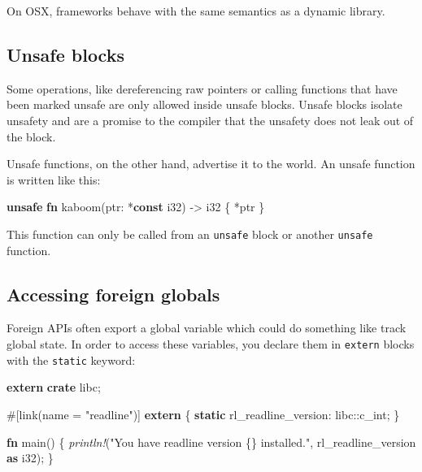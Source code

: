 \documentclass[a4paper,]{book}
\newenvironment{Shaded}{\begin{snugshade}}{\end{snugshade}}
\newcommand{\KeywordTok}[1]{\textcolor[rgb]{0.13,0.29,0.53}{\textbf{{#1}}}}
\newcommand{\DataTypeTok}[1]{\textcolor[rgb]{0.13,0.29,0.53}{{#1}}}
\newcommand{\StringTok}[1]{\textcolor[rgb]{0.31,0.60,0.02}{{#1}}}
\newcommand{\PreprocessorTok}[1]{\textcolor[rgb]{0.56,0.35,0.01}{\textit{{#1}}}}
\newcommand{\AttributeTok}[1]{\textcolor[rgb]{0.77,0.63,0.00}{{#1}}}
\newcommand{\NormalTok}[1]{{#1}}
\begin{document}
On OSX, frameworks behave with the same semantics as a dynamic library.

\subsection{Unsafe blocks}\label{unsafe-blocks}

Some operations, like dereferencing raw pointers or calling functions
that have been marked unsafe are only allowed inside unsafe blocks.
Unsafe blocks isolate unsafety and are a promise to the compiler that
the unsafety does not leak out of the block.

Unsafe functions, on the other hand, advertise it to the world. An
unsafe function is written like this:

\begin{Shaded}
\begin{Highlighting}[]
\KeywordTok{unsafe} \KeywordTok{fn} \NormalTok{kaboom(ptr: *}\KeywordTok{const} \DataTypeTok{i32}\NormalTok{) -> }\DataTypeTok{i32} \NormalTok{\{ *ptr \}}
\end{Highlighting}
\end{Shaded}

This function can only be called from an \texttt{unsafe} block or
another \texttt{unsafe} function.

\subsection{Accessing foreign globals}\label{accessing-foreign-globals}

Foreign APIs often export a global variable which could do something
like track global state. In order to access these variables, you declare
them in \texttt{extern} blocks with the \texttt{static} keyword:

\begin{Shaded}
\begin{Highlighting}[]
\KeywordTok{extern} \KeywordTok{crate} \NormalTok{libc;}

\AttributeTok{#[}\NormalTok{link}\AttributeTok{(}\NormalTok{name }\AttributeTok{=} \StringTok{"readline"}\AttributeTok{)]}
\KeywordTok{extern} \NormalTok{\{}
    \KeywordTok{static} \NormalTok{rl_readline_version: libc::}\DataTypeTok{c_int}\NormalTok{;}
\NormalTok{\}}

\KeywordTok{fn} \NormalTok{main() \{}
    \PreprocessorTok{println!}\NormalTok{(}\StringTok{"You have readline version \{\} installed."}\NormalTok{,}
             \NormalTok{rl_readline_version }\KeywordTok{as} \DataTypeTok{i32}\NormalTok{);}
\NormalTok{\}}
\end{Highlighting}
\end{Shaded}
\end{document}
